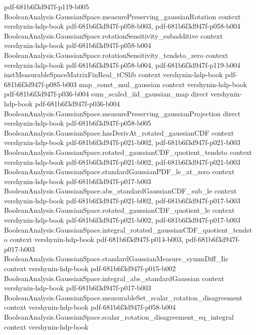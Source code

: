 \begin{theorem}
{    pdf-681b6f3d947f-p119-b005}
\proofstep
  {BooleanAnalysis.GaussianSpace.measurePreserving_gaussianRotation}
  {context}
  {vershynin-hdp-book}
  {pdf-681b6f3d947f-p058-b003,
    pdf-681b6f3d947f-p058-b004}
\proofstep
  {BooleanAnalysis.GaussianSpace.rotationSensitivity_subadditive}
  {context}
  {vershynin-hdp-book}
  {pdf-681b6f3d947f-p058-b004}
\proofstep
  {BooleanAnalysis.GaussianSpace.rotationSensitivity_tendsto_zero}
  {context}
  {vershynin-hdp-book}
  {pdf-681b6f3d947f-p058-b004,
    pdf-681b6f3d947f-p119-b004}
\proofstep
  {instMeasurableSpaceMatrixFinReal_tCSlib}
  {context}
  {vershynin-hdp-book}
  {pdf-681b6f3d947f-p085-b003}
\proofstep
  {map_const_mul_gaussian}
  {context}
  {vershynin-hdp-book}
  {pdf-681b6f3d947f-p036-b004}
\proofstep
  {sum_scaled_iid_gaussian_map}
  {direct}
  {vershynin-hdp-book}
  {pdf-681b6f3d947f-p036-b004}
\proofstep
  {BooleanAnalysis.GaussianSpace.measurePreserving_gaussianProjection}
  {direct}
  {vershynin-hdp-book}
  {pdf-681b6f3d947f-p058-b005}
\proofstep
  {BooleanAnalysis.GaussianSpace.hasDerivAt_rotated_gaussianCDF}
  {context}
  {vershynin-hdp-book}
  {pdf-681b6f3d947f-p021-b002,
    pdf-681b6f3d947f-p021-b003}
\proofstep
  {BooleanAnalysis.GaussianSpace.rotated_gaussianCDF_quotient_tendsto}
  {context}
  {vershynin-hdp-book}
  {pdf-681b6f3d947f-p021-b002,
    pdf-681b6f3d947f-p021-b003}
\proofstep
  {BooleanAnalysis.GaussianSpace.standardGaussianPDF_le_at_zero}
  {context}
  {vershynin-hdp-book}
  {pdf-681b6f3d947f-p017-b003}
\proofstep
  {BooleanAnalysis.GaussianSpace.abs_standardGaussianCDF_sub_le}
  {context}
  {vershynin-hdp-book}
  {pdf-681b6f3d947f-p021-b002,
    pdf-681b6f3d947f-p017-b003}
\proofstep
  {BooleanAnalysis.GaussianSpace.rotated_gaussianCDF_quotient_le}
  {context}
  {vershynin-hdp-book}
  {pdf-681b6f3d947f-p021-b002,
    pdf-681b6f3d947f-p017-b003}
\proofstep
  {BooleanAnalysis.GaussianSpace.integral_rotated_gaussianCDF_quotient_tendsto}
  {context}
  {vershynin-hdp-book}
  {pdf-681b6f3d947f-p014-b003,
    pdf-681b6f3d947f-p017-b003}
\proofstep
  {BooleanAnalysis.GaussianSpace.standardGaussianMeasure_symmDiff_Iic}
  {context}
  {vershynin-hdp-book}
  {pdf-681b6f3d947f-p015-b002}
\proofstep
  {BooleanAnalysis.GaussianSpace.integral_abs_standardGaussian}
  {context}
  {vershynin-hdp-book}
  {pdf-681b6f3d947f-p017-b003}
\proofstep
  {BooleanAnalysis.GaussianSpace.measurableSet_scalar_rotation_disagreement}
  {context}
  {vershynin-hdp-book}
  {pdf-681b6f3d947f-p058-b004}
\proofstep
  {BooleanAnalysis.GaussianSpace.scalar_rotation_disagreement_eq_integral}
  {context}
  {vershynin-hdp-book}

\end{theorem}
